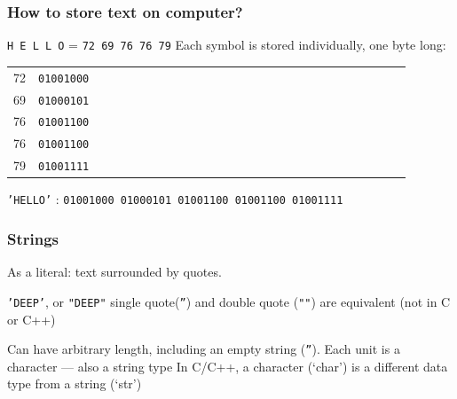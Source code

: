 \documentclass[11pt]{beamer}
\begin{document}
\begin{frame}
  \frametitle{How to store text on computer?}
  \Enlarge

  \begin{itemize}
  \myitem \texttt{H E L L O} = \texttt{72 69 76 76 79} \pause
  \myitem  Each symbol is stored individually, one byte long: \\
   \vspace{2mm} \pause
    \begin{tabular}{*{27}{l}}
      72 & \texttt{01001000} \\
      69 & \texttt{01000101} \\
      76 & \texttt{01001100} \\
      76 & \texttt{01001100} \\
      79 & \texttt{01001111} \\
    \end{tabular} \pause
    
    \vspace{2mm}
    {\small \texttt{'HELLO'} : \textcolor{CS101GradBot}{\texttt{01001000 01000101 01001100 01001100 01001111}}}
  \end{itemize}
\end{frame}


\begin{frame}
  \frametitle{Strings}
  \Enlarge

  \begin{itemize}
  \myitem  As a literal:  text surrounded by quotes.
    \begin{itemize}
    \mysubitem  \texttt{'DEEP'}, or \texttt{"DEEP"} \pause
    \mysubitem single quote(\texttt{''}) and double quote (\texttt{""}) are equivalent (not in C or C++)
    \end{itemize}\pause
  \myitem  Can have arbitrary length, including an empty string (\texttt{''}). \pause
  \myitem  Each unit is a character --- also a string type \pause
  \myitem  In C/C++, a character (`char') is a different data type from a string (`str')
  \end{itemize}
\end{frame}
\end{document}
